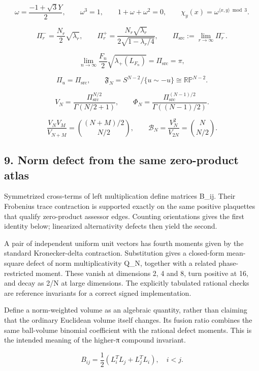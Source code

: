 \documentclass[
  10pt,
]{article}
\begin{document}
\[
\omega=\frac{-1+\sqrt3Y}{2},\qquad \omega^3=1,\qquad 1+\omega+\omega^2=0,\qquad \chi_y(x)=\omega^{\langle x,y\rangle\bmod3}.
\tag{15a}
\]

\[
\Pi_r^-=\frac{N_r}{2}\sqrt{\lambda_r},\qquad
\Pi_r^+=\frac{N_r\sqrt{\lambda_r}}{2\sqrt{1-\lambda_r/4}},\qquad
\boxed{\Pi_{\mathrm{src}}:=\lim_{r\to\infty}\Pi_r^-}.\tag{15b}
\]

\[
\boxed{\lim_{n\to\infty}\frac{F_n}{2}\sqrt{\lambda_+(L_{F_n})}=\Pi_{\mathrm{src}}=\pi},\tag{15c}
\]

\[
\Pi_u=\Pi_{\mathrm{src}},\qquad\mathfrak F_N=S^{N-2}/\{u\sim-u\}\cong\mathbb{RP}^{N-2}.
\tag{15}
\]

\[
V_N=\frac{\Pi_{\mathrm{src}}^{N/2}}{\Gamma(N/2+1)},\qquad
\Phi_N=\frac{\Pi_{\mathrm{src}}^{(N-1)/2}}{\Gamma((N-1)/2)}.
\tag{16}
\]

\[
\frac{V_N V_M}{V_{N+M}}=\binom{(N+M)/2}{N/2},\qquad
\mathcal B_N=\frac{V_N^2}{V_{2N}}=\binom N{N/2}.
\tag{17}
\]

\subsection{9. Norm defect from the same zero-product
atlas}\label{norm-defect-from-the-same-zero-product-atlas}

Symmetrized cross-terms of left multiplication define matrices B\_ij.
Their Frobenius trace contraction is supported exactly on the same
positive plaquettes that qualify zero-product assessor edges. Counting
orientations gives the first identity below; linearized alternativity
defects then yield the second.

A pair of independent uniform unit vectors has fourth moments given by
the standard Kronecker-delta contraction. Substitution gives a
closed-form mean-square defect of norm multiplicativity Q\_N, together
with a related phase-restricted moment. These vanish at dimensions 2, 4
and 8, turn positive at 16, and decay as 2/N at large dimensions. The
explicitly tabulated rational checks are reference invariants for a
correct signed implementation.

Define a norm-weighted volume as an algebraic quantity, rather than
claiming that the ordinary Euclidean volume itself changes. Its fusion
ratio combines the same ball-volume binomial coefficient with the
rational defect moments. This is the intended meaning of the higher-π
compound invariant.

\[
B_{ij}=\frac12(L_i^TL_j+L_j^TL_i),\quad i<j.
\tag{18}
\]
\end{document}
